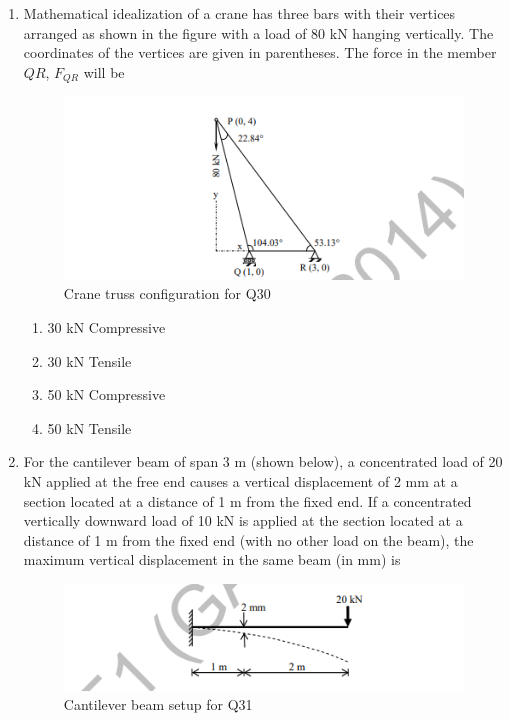 \documentclass[journal,12pt,onecolumn]{IEEEtran}
\theoremstyle{remark}
\begin{document}
\begin{enumerate}
\item Mathematical idealization of a crane has three bars with their vertices arranged as shown in the figure with a load of 80 kN hanging vertically. The coordinates of the vertices are given in parentheses. The force in the member $QR$, $F_{QR}$ will be \hfill{}

\begin{figure}[H]
\centering
\includegraphics[width=0.7\linewidth]{figs/image9.png}
\caption{Crane truss configuration for Q30}
\label{fig:q30}
\end{figure}

\begin{multicols}{4}
\begin{enumerate}
\item 30 kN Compressive
\item 30 kN Tensile
\item 50 kN Compressive
\item 50 kN Tensile
\end{enumerate}
\end{multicols}

\item For the cantilever beam of span 3 m (shown below), a concentrated load of 20 kN applied at the free end causes a vertical displacement of 2 mm at a section located at a distance of 1 m from the fixed end. If a concentrated vertically downward load of 10 kN is applied at the section located at a distance of 1 m from the fixed end (with no other load on the beam), the maximum vertical displacement in the same beam (in mm) is \hfill{}

\begin{figure}[H]
\centering
\includegraphics[width=0.7\linewidth]{figs/image10.png}
\caption{Cantilever beam setup for Q31}
\label{fig:q31}
\end{figure}


\end{enumerate}
\end{document}
